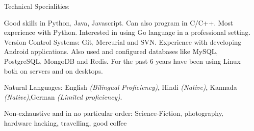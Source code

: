 \documentclass[10pt,a4paper]{article}
\begin{document}
\spacedhrule{0.5em}{-0.4em}


\inlineheadsection  %
  {Technical Specialities:}
  {Good skills in Python, Java, Javascript. Can also program in C/C++. Most experience with Python. Interested in using Go language in a professional setting. Version Control Systems: Git, Mercurial and SVN. Experience with developing Android applications. Also used and configured databases like MySQL, PostgreSQL, MongoDB and Redis. For the past 6 years have been using Linux both on servers and on desktops.

}

\inlineheadsection
  {Natural Languages:}
  {English \emph{(Bilingual Proficiency)}, Hindi \emph{(Native)}, Kannada \emph{(Native)},German \emph{(Limited proficiency)}.}


\spacedhrule{1.6em}{-0.4em}


\inlineheadsection
  {Non-exhaustive and in no particular order:}
  {Science-Fiction, photography, hardware hacking, travelling, good coffee}
\end{document}
